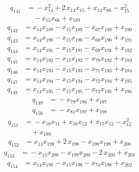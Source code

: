 \documentclass[11pt]{article}
\theoremstyle{remark}\newtheorem{remark}[theorem]{Remark}
\begin{document}
\begin{align*}
q_{141} &={}-x_{14}^{2} +2\,x_{14}x_{15} +x_{14}x_{66} -x_{15}^{2}\\
&\quad -x_{15}x_{66} +x_{189}
\end{align*}
\begin{align*}
q_{142} &={}x_{14}x_{189} -x_{15}x_{189} -x_{67}x_{189} +x_{190}
\end{align*}
\begin{align*}
q_{143} &={}x_{14}x_{190} -x_{15}x_{190} -x_{68}x_{190} +x_{191}
\end{align*}
\begin{align*}
q_{144} &={}x_{14}x_{191} -x_{15}x_{191} -x_{69}x_{191} +x_{192}
\end{align*}
\begin{align*}
q_{145} &={}x_{14}x_{192} -x_{15}x_{192} -x_{70}x_{192} +x_{193}
\end{align*}
\begin{align*}
q_{146} &={}x_{14}x_{193} -x_{15}x_{193} -x_{71}x_{193} +x_{194}
\end{align*}
\begin{align*}
q_{147} &={}x_{14}x_{194} -x_{15}x_{194} -x_{72}x_{194} +x_{195}
\end{align*}
\begin{align*}
q_{148} &={}x_{14}x_{195} -x_{15}x_{195} -x_{73}x_{195} +x_{196}
\end{align*}
\begin{align*}
q_{149} &={}-x_{79}x_{196} +x_{197}
\end{align*}
\begin{align*}
q_{150} &={}-x_{81}x_{197} +x_{198}
\end{align*}
\begin{align*}
q_{151} &={}-x_{10}x_{11} +x_{10}x_{12} +x_{11}x_{12} -x_{12}^{2}\\
&\quad +x_{199}
\end{align*}
\begin{align*}
q_{152} &={}x_{13}x_{198} +2\,x_{198} -x_{198}x_{199} +x_{200}
\end{align*}
\begin{align*}
q_{153} &={}-x_{13}x_{200} -x_{199}x_{200} -2\,x_{200} +x_{201}
\end{align*}
\begin{align*}
q_{154} &={}x_{14}x_{198} -x_{15}x_{198} -x_{74}x_{198} +x_{202}
\end{align*}
\endgroup
\end{document}
